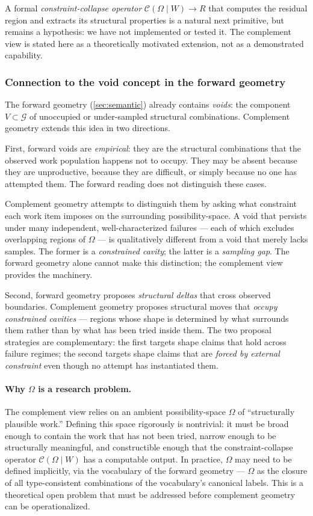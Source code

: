 \documentclass[11pt]{article}
\theoremstyle{gowthm}
\theoremstyle{gowplain}
\begin{document}
A formal \emph{constraint-collapse operator} $\mathcal{C}(\Omega \mid W) \to R$
that computes the residual region and extracts its structural properties is a
natural next primitive, but remains a hypothesis: we have not implemented or
tested it. The complement view is stated here as a theoretically motivated
extension, not as a demonstrated capability.

\subsubsection*{Connection to the void concept in the forward geometry}

The forward geometry (\cref{sec:semantic}) already contains \emph{voids}: the
component $V \subset \mathcal{G}$ of unoccupied or under-sampled structural
combinations. Complement geometry extends this idea in two directions.

First, forward voids are \emph{empirical}: they are the structural combinations
that the observed work population happens not to occupy. They may be absent
because they are unproductive, because they are difficult, or simply because
no one has attempted them. The forward reading does not distinguish these cases.

Complement geometry attempts to distinguish them by asking what
constraint each work item imposes on the surrounding possibility-space. A void
that persists under many independent, well-characterized failures --- each of
which excludes overlapping regions of $\Omega$ --- is qualitatively different
from a void that merely lacks samples. The former is a \emph{constrained cavity};
the latter is a \emph{sampling gap}. The forward geometry alone cannot make
this distinction; the complement view provides the machinery.

Second, forward geometry proposes \emph{structural deltas} that cross observed
boundaries. Complement geometry proposes structural moves that \emph{occupy
constrained cavities} --- regions whose shape is determined by what surrounds
them rather than by what has been tried inside them. The two proposal
strategies are complementary: the first targets shape claims that hold across
failure regimes; the second targets shape claims that are \emph{forced by
external constraint} even though no attempt has instantiated them.

\paragraph{Why $\Omega$ is a research problem.}
The complement view relies on an ambient possibility-space $\Omega$ of
``structurally plausible work.'' Defining this space rigorously is nontrivial:
it must be broad enough to contain the work that has not been tried, narrow
enough to be structurally meaningful, and constructible enough that the
constraint-collapse operator $\mathcal{C}(\Omega \mid W)$ has a computable
output. In practice, $\Omega$ may need to be defined implicitly, via the
vocabulary of the forward geometry --- $\Omega$ as the closure of all
type-consistent combinations of the vocabulary's canonical labels. This is a
theoretical open problem that must be addressed before complement geometry can
be operationalized.
\end{document}
